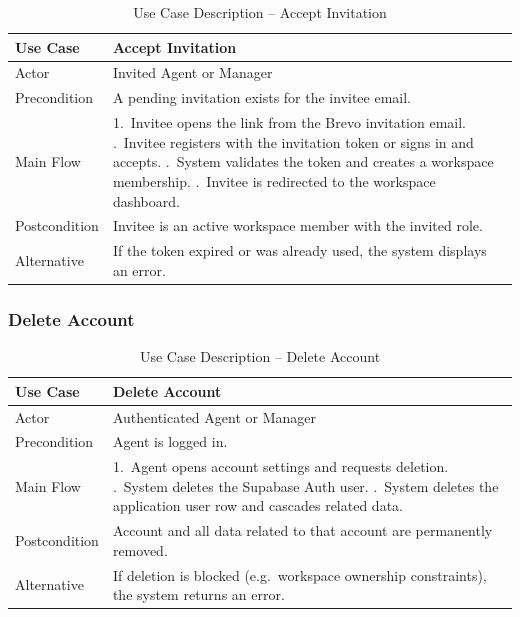 \documentclass[12pt,a4paper]{report}
\newcommand{\reporttablesetup}{%
  \small%
  \setlength{\tabcolsep}{5pt}%
  \renewcommand{\arraystretch}{1.22}%
  \arrayrulecolor{framegray}%
}
\begin{document}
\begin{table}[H]
  \centering
  \reporttablesetup
  \begin{tabularx}{\textwidth}{|p{3.1cm}|Y|}
    \hline
    Use Case     & Accept Invitation \\
    \hline
    Actor        & Invited Agent or Manager \\
    \hline
    Precondition & A pending invitation exists for the invitee email. \\
    \hline
    Main Flow    & 1.\ Invitee opens the link from the Brevo invitation email. .\ Invitee registers with the invitation token or signs in and
                       accepts. .\ System validates the token and creates a workspace membership.
                       .\ Invitee is redirected to the workspace dashboard. \\
    \hline
    Postcondition & Invitee is an active workspace member with the invited role. \\
    \hline
    Alternative  & If the token expired or was already used, the system displays an
                   error. \\
    \hline
  \end{tabularx}
  \caption{Use Case Description -- Accept Invitation}
  \label{tab:uc-accept}
\end{table}

\subsubsection{Delete Account}

\begin{table}[H]
  \centering
  \reporttablesetup
  \begin{tabularx}{\textwidth}{|p{3.1cm}|Y|}
    \hline
    Use Case     & Delete Account \\
    \hline
    Actor        & Authenticated Agent or Manager \\
    \hline
    Precondition & Agent is logged in. \\
    \hline
    Main Flow    & 1.\ Agent opens account settings and requests deletion. .\ System deletes the Supabase Auth user. .\ System deletes the application user row and cascades related
                       data. \\
    \hline
    Postcondition & Account and all data related to that account are permanently
                   removed. \\
    \hline
    Alternative  & If deletion is blocked (e.g.\ workspace ownership constraints),
                   the system returns an error. \\
    \hline
  \end{tabularx}
  \caption{Use Case Description -- Delete Account}
  \label{tab:uc-delete}
\end{table}
\end{document}
